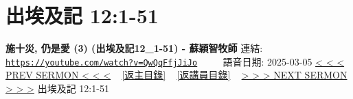 \documentclass{book}
\begin{document}
\section{出埃及記 12:1-51}
\label{sec:QwQqFfjJiJo}
\textbf{施十災, 仍是愛 (3) (出埃及記12\_1-51) -  蘇穎智牧師}
\newline
\newline
連結: \href{https://youtube.com/watch?v=QwQqFfjJiJo}{\texttt{https://youtube.com/watch?v=QwQqFfjJiJo}} ~~~~ 語音日期: 2025-03-05
\newline
\newline
\hyperref[sec:8LlYAk0Xlok]{< < < PREV SERMON < < <}
~
\hyperlink{toc}{[返主目錄]}
~
\hyperref[ch:preacher10]{[返講員目錄]}
~
\hyperref[sec:AIPkez5NCbg]{> > > NEXT SERMON > > >}
\newline
\newline
出埃及記 12:1-51
\newline
\end{document}
